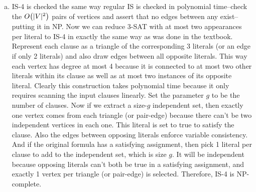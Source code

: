 \documentclass[11pt]{article}
\let\origleft\left
\let\origright\right
\renewcommand{\left}{\mathopen{}\mathclose\bgroup\origleft}
\renewcommand{\right}{\aftergroup\egroup\origright}
\newcommand{\p}[1]{\left(#1\right)}
\newcommand{\BigOh}[1]{O\p{#1}}
\begin{document}
\begin{enumerate}[(a)]
\item IS-4 is checked the same way regular IS is checked in polynomial time--check the $\BigOh{|V|^2}$ pairs of vertices and assert that no edges between any exist--putting it in NP. Now we can reduce 3-SAT with at most two appearances per literal to IS-4 in exactly the same way as was done in the textbook. Represent each clause as a triangle of the corresponding 3 literals (or an edge if only 2 literals) and also draw edges between all opposite literals. This way each vertex has degree at most 4 because it is connected to at most two other literals within its clause as well as at most two instances of its opposite literal. Clearly this construction takes polynomial time because it only requires scanning the input clauses linearly. Set the parameter $g$ to be the number of clauses. Now if we extract a size-$g$ independent set, then exactly one vertex comes from each triangle (or pair-edge) because there can't be two independent vertices in each one. This literal is set to true to satisfy the clause. Also the edges between opposing literals enforce variable consistency. And if the original formula has a satisfying assignment, then pick 1 literal per clause to add to the independent set, which is size $g$. It will be independent because opposing literals can't both be true in a satisfying assignment, and exactly 1 vertex per triangle (or pair-edge) is selected. Therefore, IS-4 is NP-complete.
\end{enumerate}


\newpage
\end{document}
